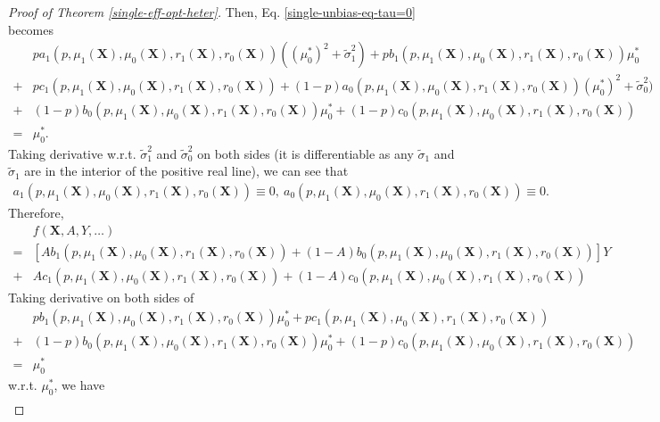 \documentclass[11pt]{article}
\theoremstyle{referenceplain}
\theoremstyle{referencedefinition}
\theoremstyle{referenceremark}
\begin{document}
\begin{proof}[Proof of Theorem \ref{single-eff-opt-heter}]
Then, Eq. \eqref{single-unbias-eq-tau=0} becomes
\begin{align*}
   & p a_1(p,\mu_1(\mathbf{X}),\mu_0(\mathbf{X}),r_1(\mathbf{X}),r_0(\mathbf{X})) ((\mu_0^*)^2+\widetilde{\sigma}_1^2) + p b_1(p,\mu_1(\mathbf{X}),\mu_0(\mathbf{X}),r_1(\mathbf{X}),r_0(\mathbf{X})) \mu_0^*\\+ &pc_1(p,\mu_1(\mathbf{X}),\mu_0(\mathbf{X}),r_1(\mathbf{X}),r_0(\mathbf{X}))
    +(1-p) a_0(p,\mu_1(\mathbf{X}),\mu_0(\mathbf{X}),r_1(\mathbf{X}),r_0(\mathbf{X}))(\mu_0^*)^2+\widetilde{\sigma}_0^2) \\+& (1-p) b_0(p,\mu_1(\mathbf{X}),\mu_0(\mathbf{X}),r_1(\mathbf{X}),r_0(\mathbf{X})) \mu_0^*+(1-p) c_0(p,\mu_1(\mathbf{X}),\mu_0(\mathbf{X}),r_1(\mathbf{X}),r_0(\mathbf{X}))\\=&\mu_0^*.
\end{align*}
Taking derivative w.r.t. $\widetilde{\sigma}_1^2$ and $\widetilde{\sigma}_0^2$ on both sides (it is differentiable as any $\widetilde{\sigma}_1$ and $\widetilde{\sigma}_1$ are in the interior of the positive real line), we can see that
\begin{align*}
    a_1(p,\mu_1(\mathbf{X}),\mu_0(\mathbf{X}),r_1(\mathbf{X}),r_0(\mathbf{X}))\equiv0,~a_0(p,\mu_1(\mathbf{X}),\mu_0(\mathbf{X}),r_1(\mathbf{X}),r_0(\mathbf{X}))\equiv 0.
\end{align*}
Therefore, 
\begin{align*}
   & f(\mathbf{X},A,Y,\dots)\\ =  &[Ab_1(p,\mu_1(\mathbf{X}),\mu_0(\mathbf{X}),r_1(\mathbf{X}),r_0(\mathbf{X})) + (1-A)b_0(p,\mu_1(\mathbf{X}),\mu_0(\mathbf{X}),r_1(\mathbf{X}),r_0(\mathbf{X}))]Y \\+& Ac_1(p,\mu_1(\mathbf{X}),\mu_0(\mathbf{X}),r_1(\mathbf{X}),r_0(\mathbf{X}))+(1-A) c_0(p,\mu_1(\mathbf{X}),\mu_0(\mathbf{X}),r_1(\mathbf{X}),r_0(\mathbf{X}))
\end{align*}
Taking derivative on both sides of 
\begin{align*}
   & p b_1(p,\mu_1(\mathbf{X}),\mu_0(\mathbf{X}),r_1(\mathbf{X}),r_0(\mathbf{X})) \mu_0^*+ pc_1(p,\mu_1(\mathbf{X}),\mu_0(\mathbf{X}),r_1(\mathbf{X}),r_0(\mathbf{X}))
   \\+& (1-p) b_0(p,\mu_1(\mathbf{X}),\mu_0(\mathbf{X}),r_1(\mathbf{X}),r_0(\mathbf{X})) \mu_0^*+(1-p) c_0(p,\mu_1(\mathbf{X}),\mu_0(\mathbf{X}),r_1(\mathbf{X}),r_0(\mathbf{X}))\\=&\mu_0^*
\end{align*}
w.r.t. $\mu_0^*$, we have
\begin{align}

\end{align}
\end{proof}
\end{document}
